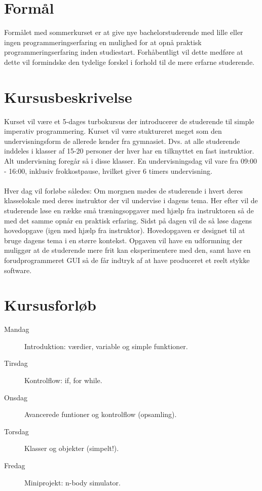 \documentclass[12pt]{article}
\begin{document}
\maketitle


\section{Formål}
Formålet med sommerkurset er at give nye bachelorstuderende med lille eller ingen
programmeringserfaring en mulighed for at opnå praktisk programmeringserfaring   
inden studiestart. Forhåbentligt vil dette medføre at dette vil formindske den
tydelige forskel i forhold til de mere erfarne studerende. %

\section{Kursusbeskrivelse}
Kurset vil være et 5-dages turbokursus der introducerer de studerende til simple
imperativ programmering. 
Kurset vil være stuktureret meget som den undervisningsform de allerede kender
fra gymnasiet. Dvs. at alle studerende inddeles i klasser af 15-20 personer der
hver har en tilknyttet en fast instruktior. Alt undervisning foregår så i disse
klasser. En undervisningsdag vil vare fra 09:00 - 16:00, inklusiv frokkostpause,
hvilket giver 6 timers undervisning.
\\\\
Hver dag vil forløbe således: Om morgnen mødes de studerende i hvert deres 
klasselokale med deres instruktor der vil undervise i dagens tema. Her efter vil 
de studerende løse en række små træningsopgaver med hjælp fra instruktoren så de
med det samme opnår en praktisk erfaring. Sidst på dagen vil de så løse dagens
hovedopgave (igen med hjælp fra instruktor). Hovedopgaven er designet til at 
bruge dagens tema i en større kontekst. Opgaven vil have en udformning der 
muliggør at de studerende mere frit kan eksperimentere med den, samt have en 
forudprogrammeret GUI så de får indtryk af at have produceret et reelt stykke 
software.

\section{Kursusforløb}
\begin{description}
  \item[Mandag] Introduktion: værdier, variable og simple funktioner.
  \item[Tirsdag] Kontrolflow: if, for while.
  \item[Onsdag] Avancerede funtioner og kontrolflow (opsamling).
  \item[Torsdag] Klasser og objekter (simpelt!).
  \item[Fredag] Miniprojekt: n-body simulator.
\end{description}
\end{document}
